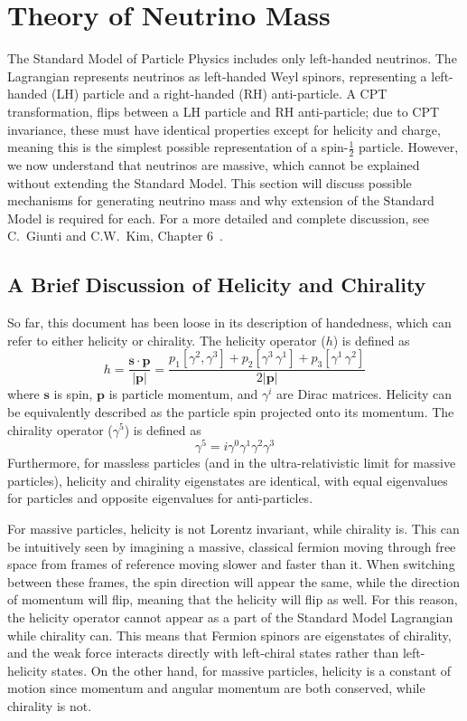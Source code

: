 \documentclass[/main.tex]{subfiles}
\begin{document}
\section{Theory of Neutrino Mass} \label{sec:numasstheory}
The Standard Model of Particle Physics includes only left-handed neutrinos.
The Lagrangian represents neutrinos as left-handed Weyl spinors, representing a left-handed (LH) particle and a right-handed (RH) anti-particle.
A CPT transformation, flips between a LH particle and RH anti-particle; due to CPT invariance, these must have identical properties except for helicity and charge, meaning this is the simplest possible representation of a spin-$\frac{1}{2}$ particle.
However, we now understand that neutrinos are massive, which cannot be explained without extending the Standard Model.
This section will discuss possible mechanisms for generating neutrino mass and why extension of the Standard Model is required for each.
For a more detailed and complete discussion, see C.~Giunti and C.W.~Kim, Chapter 6~\cite{Giunti}.

\subsection{A Brief Discussion of Helicity and Chirality} \label{sec:helicitychirality}
So far, this document has been loose in its description of handedness, which can refer to either helicity or chirality.
The helicity operator ($h$) is defined as
\begin{equation}
  h=\mathbf{\frac{s\cdot p}{|p|}}=\frac{p_1[\gamma^2,\gamma^3]+p_2[\gamma^3\,\gamma^1]+p_3[\gamma^1\,\gamma^2]}{2|\mathbf{p}|}
\end{equation}
where $\mathbf{s}$ is spin, $\mathbf{p}$ is particle momentum, and $\gamma^i$ are Dirac matrices.
Helicity can be equivalently described as the particle spin projected onto its momentum.
The chirality operator ($\gamma^5$) is defined as 
\begin{equation}
  \gamma^5=i\gamma^0\gamma^1\gamma^2\gamma^3
\end{equation}
Furthermore, for massless particles (and in the ultra-relativistic limit for massive particles), helicity and chirality eigenstates are identical, with equal eigenvalues for particles and opposite eigenvalues for anti-particles.

For massive particles, helicity is not Lorentz invariant, while chirality is.
This can be intuitively seen by imagining a massive, classical fermion moving through free space from frames of reference moving slower and faster than it.
When switching between these frames, the spin direction will appear the same, while the direction of momentum will flip, meaning that the helicity will flip as well.
For this reason, the helicity operator cannot appear as a part of the Standard Model Lagrangian while chirality can.
This means that Fermion spinors are eigenstates of chirality, and the weak force interacts directly with left-chiral states rather than left-helicity states.
On the other hand, for massive particles, helicity is a constant of motion since momentum and angular momentum are both conserved, while chirality is not.
\end{document}
